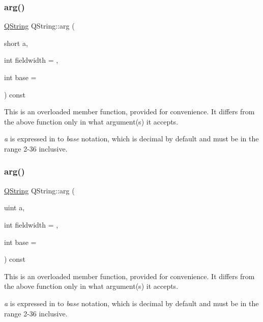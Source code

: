 \subsubsection{\texorpdfstring{arg()}{arg()}\hspace{0.1cm}{\footnotesize\ttfamily [7/10]}}
{\footnotesize\ttfamily \mbox{\hyperlink{class_q_string}{Q\+String}} Q\+String\+::arg (\begin{DoxyParamCaption}\item[{short}]{a,  }\item[{int}]{fieldwidth = {},  }\item[{int}]{base = {} }\end{DoxyParamCaption}) const\hspace{0.3cm}{\ttfamily [inline]}}

This is an overloaded member function, provided for convenience. It differs from the above function only in what argument(s) it accepts.

{\itshape a} is expressed in to {\itshape base} notation, which is decimal by default and must be in the range 2-\/36 inclusive. \mbox{\label{class_q_string_a9ba06d783305c502518f516e035788d1}} 
\subsubsection{\texorpdfstring{arg()}{arg()}\hspace{0.1cm}{\footnotesize\ttfamily [8/10]}}
{\footnotesize\ttfamily \mbox{\hyperlink{class_q_string}{Q\+String}} Q\+String\+::arg (\begin{DoxyParamCaption}\item[{uint}]{a,  }\item[{int}]{fieldwidth = {},  }\item[{int}]{base = {} }\end{DoxyParamCaption}) const\hspace{0.3cm}{\ttfamily [inline]}}

This is an overloaded member function, provided for convenience. It differs from the above function only in what argument(s) it accepts.

{\itshape a} is expressed in to {\itshape base} notation, which is decimal by default and must be in the range 2-\/36 inclusive. \mbox{\label{class_q_string_af1d2de1335207cb1999634fa8cd98141}} 
